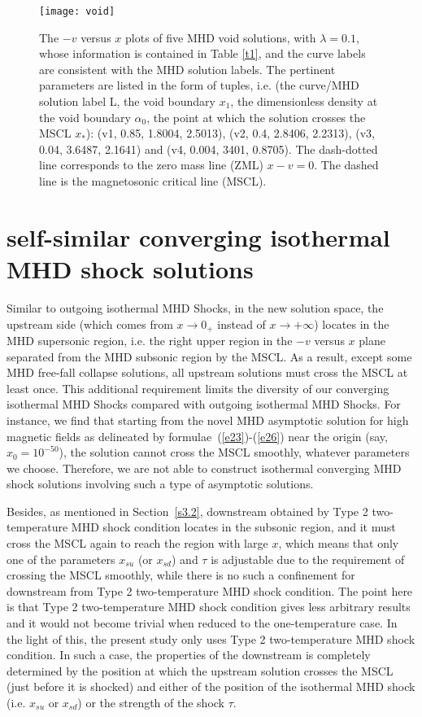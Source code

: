 \documentclass[fleqn,usenatbib]{mnras}
\begin{document}
\begin{figure}
\centering
\texttt{[image: void]}
\caption{
The $-v$ versus $x$ plots of five  MHD void solutions, with $\lambda=0.1$, whose information is contained in Table \ref{t1}, and the curve labels are consistent with the MHD solution labels. The pertinent parameters are listed in the form of tuples, i.e. (the curve/MHD solution label L, the void boundary $x_{1}$, the dimensionless density at the void boundary $\alpha_{0}$, the point at which the solution crosses the MSCL $x_{*}$): (v1, 0.85, 1.8004, 2.5013), (v2, 0.4, 2.8406, 2.2313), (v3, 0.04, 3.6487, 2.1641) and (v4, 0.004, 3401, 0.8705). The dash-dotted line corresponds to the zero mass line (ZML) $x-v=0$. The dashed line is the magnetosonic critical line (MSCL). }
\label{2}
\end{figure}


\section{self-similar converging isothermal MHD shock solutions}
\label{s5}
Similar to outgoing isothermal MHD Shocks, in the new solution space, the upstream side (which comes from $x\rightarrow 0_{+}$ instead of $x\rightarrow +\infty$) locates in the MHD supersonic region, i.e. the right upper region in the $-v$ versus $x$ plane separated from the MHD subsonic region by the MSCL. As a result, except some MHD free-fall collapse solutions, all upstream solutions must cross the MSCL at least once. This additional requirement limits the diversity 
of our converging isothermal MHD Shocks compared with outgoing isothermal MHD Shocks. For instance, we find that starting from the novel MHD asymptotic solution for high magnetic fields as delineated by formulae~(\ref{e23})-(\ref{e26}) near the origin (say, $x_{0}=10^{-50}$), the solution cannot cross the MSCL smoothly, whatever parameters we choose. Therefore, we are not able to construct isothermal converging MHD shock solutions involving such a type of asymptotic solutions.

Besides, as mentioned in Section~\ref{s3.2}, downstream obtained by Type 2 two-temperature MHD shock condition locates in the subsonic region, and it must cross the MSCL again to reach the region with large $x$, which means that only one of the parameters $x_{su}$ (or $x_{sd}$) and $\tau$ is adjustable due to the requirement of crossing the MSCL smoothly, while there is no such a confinement for downstream from Type 2 two-temperature MHD shock condition. The point here is that Type 2 two-temperature MHD shock condition gives less arbitrary results and it would not become trivial when reduced to the one-temperature case. In the light of this, the present study only uses Type 2 two-temperature MHD shock condition. In such a case, the properties of the downstream is completely determined by the position at which the upstream solution crosses the MSCL (just before it is shocked) and either of the position of the isothermal MHD shock (i.e. $x_{su}$ or $x_{sd}$) or the strength of the shock $\tau$. 
\end{document}
